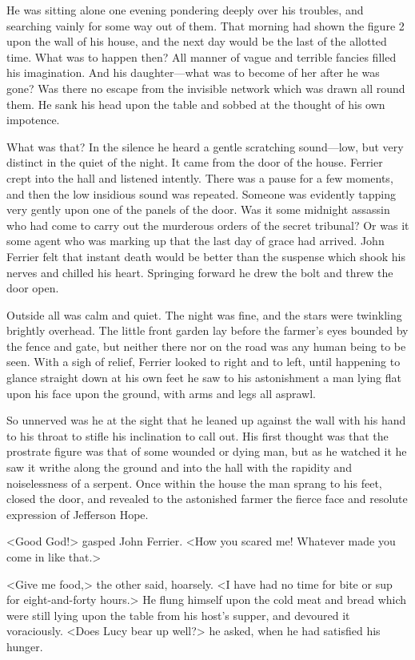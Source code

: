 He was sitting alone one evening pondering deeply over his troubles, and searching vainly for some way out of them. That morning had shown the figure 2 upon the wall of his house, and the next day would be the last of the allotted time. What was to happen then? All manner of vague and terrible fancies filled his imagination. And his daughter—what was to become of her after he was gone? Was there no escape from the invisible network which was drawn all round them. He sank his head upon the table and sobbed at the thought of his own impotence.

What was that? In the silence he heard a gentle scratching sound—low, but very distinct in the quiet of the night. It came from the door of the house. Ferrier crept into the hall and listened intently. There was a pause for a few moments, and then the low insidious sound was repeated. Someone was evidently tapping very gently upon one of the panels of the door. Was it some midnight assassin who had come to carry out the murderous orders of the secret tribunal? Or was it some agent who was marking up that the last day of grace had arrived. John Ferrier felt that instant death would be better than the suspense which shook his nerves and chilled his heart. Springing forward he drew the bolt and threw the door open.

Outside all was calm and quiet. The night was fine, and the stars were twinkling brightly overhead. The little front garden lay before the farmer's eyes bounded by the fence and gate, but neither there nor on the road was any human being to be seen. With a sigh of relief, Ferrier looked to right and to left, until happening to glance straight down at his own feet he saw to his astonishment a man lying flat upon his face upon the ground, with arms and legs all asprawl.

So unnerved was he at the sight that he leaned up against the wall with his hand to his throat to stifle his inclination to call out. His first thought was that the prostrate figure was that of some wounded or dying man, but as he watched it he saw it writhe along the ground and into the hall with the rapidity and noiselessness of a serpent. Once within the house the man sprang to his feet, closed the door, and revealed to the astonished farmer the fierce face and resolute expression of Jefferson Hope.

<Good God!> gasped John Ferrier. <How you scared me! Whatever made you come in like that.>

<Give me food,> the other said, hoarsely. <I have had no time for bite or sup for eight-and-forty hours.> He flung himself upon the cold meat and bread which were still lying upon the table from his host's supper, and devoured it voraciously. <Does Lucy bear up well?> he asked, when he had satisfied his hunger.


